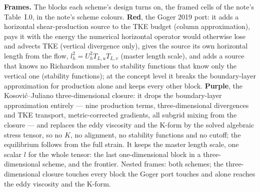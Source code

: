\documentclass[10pt]{article}
\begin{document}
\vspace{0.2ex}
{\footnotesize\textbf{Frames.} The blocks each scheme's design turns on, the framed cells of the note's Table~I.0,
in the note's scheme colours. \textcolor{cGXIX}{\textbf{Red}}, the Goger 2019 port: it adds a horizontal
shear-production source to the TKE budget (column approximation), pays it with the energy the numerical
horizontal operator would otherwise lose and advects TKE (vertical divergence only), gives the source its own
horizontal length from the flow, $l_h^2 = U_h^2 T_{L,u} T_{L,v}$ (master length scale), and adds a source that knows no
Richardson number to stability functions that know only the vertical one (stability functions); at the concept level it breaks the
boundary-layer approximation for production alone and keeps every other block. \textcolor{cFULL}{\textbf{Purple}}, the
Kosovi\'c--Juliano three-dimensional closure: it drops the boundary-layer approximation entirely --- nine production
terms, three-dimensional divergences and TKE transport, metric-corrected gradients, all subgrid mixing from the
closure --- and replaces the eddy viscosity and the K-form by the solved algebraic stress tensor, so no $K$, no
alignment, no stability functions and no cutoff; the equilibrium follows from the full strain. It keeps the master
length scale, one scalar $l$ for the whole tensor: the last one-dimensional block in a three-dimensional scheme, and
the frontier. Nested frames: both schemes; the three-dimensional closure touches every block the Goger port touches and alone reaches the eddy viscosity and the K-form.\par}
\end{document}
